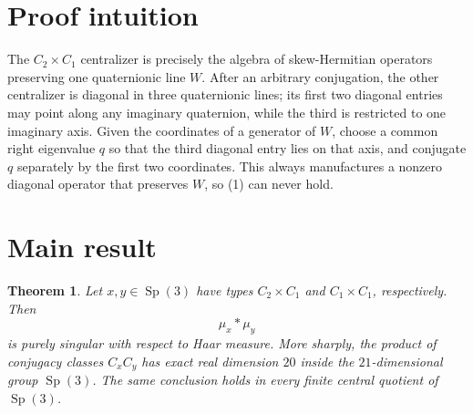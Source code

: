 \documentclass[11pt]{article}
\newtheorem{theorem}{Theorem}
\begin{document}
\section*{Proof intuition}

The \(C_2\times C_1\) centralizer is precisely the algebra of
skew-Hermitian operators preserving one quaternionic line \(W\).
After an arbitrary conjugation, the other centralizer is diagonal in three
quaternionic lines; its first two diagonal entries may point along any
imaginary quaternion, while the third is restricted to one imaginary axis.
Given the coordinates of a generator of \(W\), choose a common right
eigenvalue \(q\) so that the third diagonal entry lies on that axis, and
conjugate \(q\) separately by the first two coordinates. This always
manufactures a nonzero diagonal operator that preserves \(W\), so (1) can
never hold.

\section*{Main result}

\begin{theorem}
Let \(x,y\in\operatorname{Sp}(3)\) have types \(C_2\times C_1\) and
\(C_1\times C_1\), respectively. Then
\[
             \mu_x*\mu_y
\]
is purely singular with respect to Haar measure. More sharply, the product
of conjugacy classes \(C_xC_y\) has exact real dimension \(20\) inside the
\(21\)-dimensional group \(\operatorname{Sp}(3)\).
The same conclusion holds in every finite central quotient of
\(\operatorname{Sp}(3)\).
\end{theorem}
\end{document}
